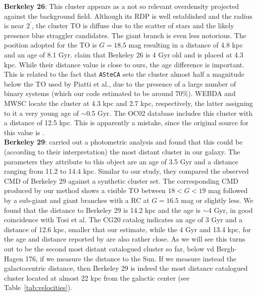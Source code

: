 \documentclass[draft]{aa}
\begin{document}
  \textbf{Berkeley 26}: This cluster appears as a not so relevant overdensity
  projected against the background field. Although its RDP is well established
  and the radius is near $2^{\prime}$, the cluster TO is diffuse due to the
  scatter of stars and the likely presence blue straggler candidates. The
  giant branch is even less notorious.
  The position adopted for the TO is $G=18.5$ mag resulting in a distance of 4.8
  kpc and an age of 8.1 Gyr. \cite{Piatti_2010} claim that Berkeley 26 is 4 Gyr
  old and is placed at 4.3 kpc. While their distance value is close to ours, the
  age difference is important. This is related to the fact that \texttt{ASteCA}
  sets the cluster almost half a magnitude below the TO used by Piatti et al.,
  due to the presence of a large number of binary systems (which our code
  estimated to be around 70\%).
  WEBDA and MWSC locate the cluster at 4.3 kpc and 2.7 kpc, respectively, the
  latter assigning to it a very young age of $\sim$0.5 Gyr. The OC02 database
  includes this cluster with a distance of 12.5 kpc. This is apparently
  a mistake, since the original source for this value is \cite{Piatti_2010}.\\

  \textbf{Berkeley 29}: \cite{Tosi_2004} carried out a photometric analysis
  and found that this could be (according to their interpretation) the most
  distant cluster in our galaxy. The parameters they attribute to this object
  are an age of 3.5 Gyr and a distance ranging from 11.2 to 14.4 kpc. Similar to
  our study, they compared the observed CMD of Berkeley 29 against a synthetic
  cluster set. The corresponding CMD produced by our method
  shows a visible TO between $18<G<19$ mag followed by a sub-giant and giant
  branches with a RC at $G=16.5$ mag or slightly less. We found that the
  distance to Berkeley 29 is 14.2 kpc and the age is $\sim$4 Gyr, in good
  coincidence with Tosi et al. The CG20 catalog indicates an age of 3 Gyr and a
  distance of 12.6 kpc, smaller that our estimate, while the 4 Gyr and 13.4
  kpc, for the age and distance reported by \cite{Frinchaboy_2006} are also
  rather close. As we will see this turns out to be the second most
  distant catalogued cluster so far, below vd Bergh-Hagen 176, if we measure
  the distance to the Sun. If we measure instead the galactocentric distance,
  then Berkeley 29 is indeed the most distance catalogued cluster located at
  almost 22 kpc from the galactic center (see Table~\ref{tab:velocities}).\\
\end{document}
